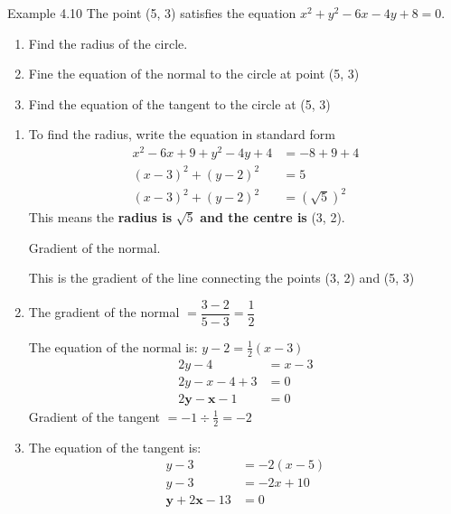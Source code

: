 \begin{example}{Example 4.10}
The point (5, 3) satisfies the equation $x^2 + y^2 - 6x - 4y + 8 = 0$.
\begin{enumerate}
  \item[a.] Find the radius of the circle.
  \item[b.] Fine the equation of the normal to the circle at point (5, 3)
  \item[c.] Find the equation of the tangent to the circle at (5, 3)
\end{enumerate}

\solution
\begin{enumerate}
  \item[a.] To find the radius, write the equation in standard form
  \begin{align*}
  x^2 - 6x + 9 + y^2 - 4y + 4 &= -8 + 9 + 4 \\
  (x - 3)^2 + (y - 2)^2 &= 5 \\
  \left(x - 3\right)^2 + \left(y - 2\right)^2 &= \left(\sqrt{5}\right)^2
  \end{align*}
  This means the \textbf{radius is} $\sqrt{5}$ \textbf{and the centre is} (3, 2).

  Gradient of the normal.

  This is the gradient of the line connecting the points (3, 2) and (5, 3)
  \item[b.] The gradient of the normal $= \dfrac{3 - 2}{5 - 3} = \dfrac{1}{2}$

  The equation of the normal is: $y - 2 = \frac{1}{2}(x - 3)$
  \begin{align*}
  2y - 4 &= x - 3 \\
  2y - x - 4 + 3 &= 0 \\
  2\boldsymbol{y} - \boldsymbol{x} - 1 &= 0
  \end{align*}
  Gradient of the tangent $= -1 \div \frac{1}{2} = -2$
  \item[c.] The equation of the tangent is:
  \begin{align*}
  y - 3 &= -2(x - 5) \\
  y - 3 &= -2x + 10 \\
  \boldsymbol{y} + 2\boldsymbol{x} - 13 &= 0
  \end{align*}
\end{enumerate}
\end{example}

